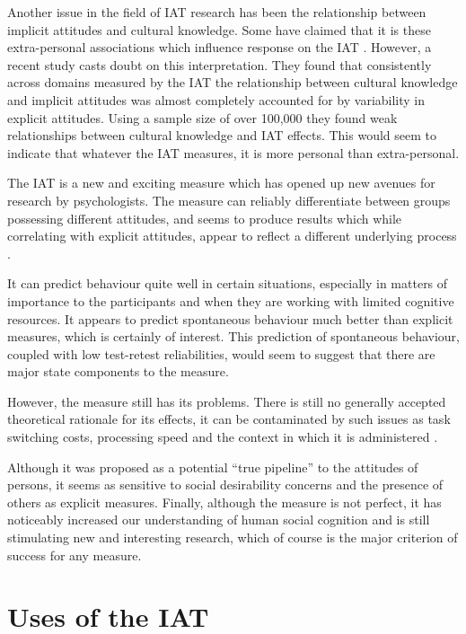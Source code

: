 Another issue in the field of IAT research has been the relationship between implicit attitudes and cultural knowledge. Some have claimed that it is these extra-personal associations which influence response on the IAT \cite{Olson2004}. However, a recent study \cite{Nosek2007a} casts doubt on this interpretation. They found that consistently across domains measured by the IAT the relationship between cultural knowledge and implicit attitudes was almost completely accounted for by variability in explicit attitudes. Using a sample size of over 100,000 they found weak relationships between cultural knowledge and IAT effects. This would seem to indicate that whatever the IAT measures, it is more personal than extra-personal. 

The IAT is a new and exciting measure which has opened up new avenues for research by psychologists.   The measure can reliably differentiate between groups possessing different attitudes, and seems to produce results which while correlating with explicit attitudes, appear to reflect a different underlying process \cite{Nosek2007a}. 

It can predict behaviour quite well in certain situations, especially in matters of importance to the participants and when they are working with limited cognitive resources. It appears to predict spontaneous behaviour much better than explicit measures, which is certainly of interest. This prediction of spontaneous behaviour, coupled with low test-retest reliabilities, would seem to suggest that there are major state components to the measure. 

However, the measure still has its problems. There is still no generally accepted theoretical rationale for its effects, it can be contaminated by such issues as task switching costs\cite{Klauer2005}, processing speed\cite{Blanton2006} and the context in which it is administered \cite{Boysen2006}. 

Although it was proposed as a potential ``true pipeline'' to the attitudes of persons, it seems as sensitive to social desirability concerns and the presence of others as explicit measures. Finally, although the measure is not perfect, it has noticeably increased our understanding of human social cognition and is still stimulating new and interesting research, which of course is the major criterion of success for any measure. 

\section{Uses of the IAT}%
\label{sec:uses-iat}


